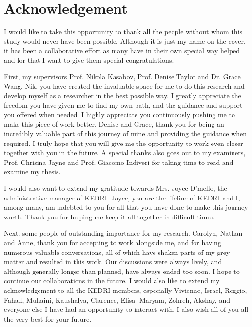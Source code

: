 %
\chapter*{Acknowledgement}
\label{sec:acknowledgement}
\vspace*{-10mm}

I would like to take this opportunity to thank all the people without whom this study would never have been possible. Although it is just my name on the cover, it has been a collaborative effort as many have in their own special way helped and for that I want to give them special congratulations.

First, my supervisors Prof. Nikola Kasabov, Prof. Denise Taylor and Dr. Grace Wang. Nik, you have created the invaluable space for me to do this research and develop myself as a researcher in the best possible way. I greatly appreciate the freedom you have given me to find my own path, and the guidance and support you offered when needed. I highly appreciate you continuously pushing me to make this piece of work better. Denise and Grace, thank you for being an incredibly valuable part of this journey of mine and providing the guidance when required. I truly hope that you will give me the opportunity to work even closer together with you in the future. A special thanks also goes out to my examiners, Prof. Chrisina Jayne and Prof. Giacomo Indiveri for taking time to read and examine my thesis. 

I would also want to extend my gratitude towards Mrs. Joyce D'mello, the administrative manager of KEDRI. Joyce, you are the lifeline of KEDRI and I, among many, am indebted to you for all that you have done to make this journey worth. Thank you for helping me keep it all together in difficult times.  

Next, some people of outstanding importance for my research. Carolyn, Nathan and Anne, thank you for accepting to work alongside me, and for having numerous valuable conversations, all of which have shaken parts of my grey matter and resulted in this work. Our discussions were always lively, and although generally longer than planned, have always ended too soon. I hope to continue our collaborations in the future. I would also like to extend my acknowledgement to all the KEDRI members, especially Vivienne, Israel, Reggio, Fahad, Muhaini, Kaushalya, Clarence, Elisa, Maryam, Zohreh, Akshay, and everyone else I have had an opportunity to interact with. I also wish all of you all the very best for your future.   

